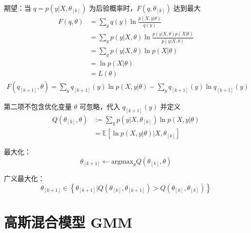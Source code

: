 \documentclass[openany]{ctexbook}
\theoremstyle{kaiti}
\theoremstyle{normal}
\begin{document}
期望：当 $q=p\left(y|X,\theta_{\left[k \right]} \right)$ 为后验概率时，$F\left(q,\theta_{\left[k \right]} \right)$ 达到最大
\begin{equation}
\begin{aligned}
  F\left(q,\theta \right)
  &=\sum_yq(y)\ln\frac{p\left(X,y|\theta \right)}{q(y)}\\
  &=\sum_yp\left(y|X,\theta \right)\ln\frac{p\left(y|X,\theta \right)p(X|\theta)}{p\left(y|X,\theta \right)} \\
  &=\sum_yp\left(y|X,\theta \right)\ln p(X|\theta)\\
  &=\ln p(X|\theta)\\
  &=L(\theta)
\end{aligned}
\end{equation}
\begin{equation}
\begin{aligned}
  F\left(q_{\left[k+1 \right]},\theta \right)=\sum_yq_{\left[k+1 \right]}(y)\ln p\left(X,y|\theta \right)-\sum_yq_{\left[k+1 \right]}(y)\ln q_{\left[k+1 \right]}(y)
\end{aligned}
\end{equation}

第二项不包含优化变量 $\theta$ 可忽略，代入 $q_{\left[k+1 \right]}(y)$ 并定义
\begin{equation}
\begin{aligned}
  Q\left(\theta_{\left[k \right]},\theta \right)&:=\sum_yp\left(y|X,\theta_{\left[k \right]} \right)\ln p\left(X,y|\theta \right)\\
  &=\mathbb{E} \left[\ln p\left(X,y|\theta \right)|X,\theta_{\left[ k \right]} \right]
\end{aligned}
\end{equation}

最大化：
\begin{equation}
\theta_{\left[k+1 \right]}\gets \mathrm{argmax}_{\theta}Q\left(\theta_{\left[k \right]},\theta \right)
\end{equation}

广义最大化：
\begin{equation}
\theta_{\left[k+1 \right]}\in \left\{ \theta_{\left[k+1 \right]}|Q\left(\theta_{\left[k \right]},\theta_{\left[k+1 \right]} \right)>Q\left(\theta_{\left[k \right]},\theta_{\left[k \right]} \right)\right\}
\end{equation}

\section{高斯混合模型 GMM}
\end{document}
